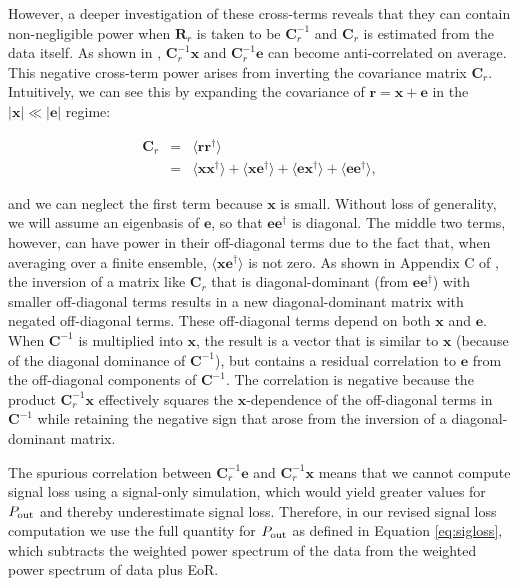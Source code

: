 \documentclass[preprint2,numberedappendix,tighten]{aastex6}  %
\begin{document}
However, a deeper investigation of these cross-terms reveals that they can contain non-negligible power when $\textbf{R}_{r}$
is taken to be $\textbf{C}_{r}^{-1}$ and
$\textbf{C}_{r}$ is estimated from the data itself.  As shown in \citet{switzer_et_al2015}, 
$\textbf{C}_{r}^{-1}\textbf{x}$ and
$\textbf{C}_{r}^{-1}\textbf{e}$
can become anti-correlated on average. 
This negative cross-term power arises from inverting the covariance matrix
$\textbf{C}_{r}$. 
Intuitively, we can see this by expanding the covariance of $\textbf{r}=\textbf{x}+\textbf{e}$ in the
$|\textbf{x}|\ll|\textbf{e}|$ regime:

\begin{eqnarray}
\textbf{C}_{r} &=& \langle \textbf{rr}^{\dagger} \rangle \\
&=& \langle \textbf{xx}^{\dagger} \rangle + \langle \textbf{xe}^{\dagger} \rangle + \langle \textbf{ex}^{\dagger} \rangle + \langle 
\textbf{ee}^{\dagger} \rangle,
\end{eqnarray}

\noindent and we can neglect the first term because $\textbf{x}$ is small.  Without loss of generality, we will assume
an eigenbasis of $\textbf{e}$, so that $\textbf{ee}^{\dagger}$ is diagonal.
The middle 
two terms, however, can have power in their off-diagonal terms due to the fact that, when averaging over a finite
ensemble, $\langle\textbf{xe}^\dagger\rangle$ is not zero.  As shown in Appendix C of \citet{parsons_et_al2014}, the
inversion of a matrix like $\textbf{C}_{r}$ that is diagonal-dominant (from $\textbf{ee}^{\dagger}$) with smaller
off-diagonal terms results in a new diagonal-dominant matrix with negated off-diagonal terms. These off-diagonal
terms depend on both $\textbf{x}$ and $\textbf{e}$. When $\textbf{C}^{-1}$ is multiplied into $\textbf{x}$,
the result is a vector that is similar to $\textbf{x}$ (because of the diagonal dominance of $\textbf{C}^{-1}$), but
contains a residual correlation to $\textbf{e}$ from the off-diagonal components of $\textbf{C}^{-1}$. The
correlation is negative because the product $\textbf{C}_r^{-1}\textbf{x}$ effectively squares the $\textbf{x}$-dependence
of the off-diagonal terms in $\textbf{C}^{-1}$ while retaining the negative sign that arose from the inversion
of a diagonal-dominant matrix.

The spurious correlation between $\textbf{C}_r^{-1}\textbf{e}$ and $\textbf{C}_r^{-1}\textbf{x}$ means that we cannot compute signal loss using a signal-only 
simulation, which would yield greater values for $P_{\rm out}$ and thereby underestimate signal loss. Therefore, in our revised 
signal loss computation we use the full quantity for $P_{\rm out}$ as defined in Equation \eqref{eq:sigloss}, which subtracts the 
weighted power spectrum of the data from the weighted power spectrum of data plus EoR. 
\end{document}
